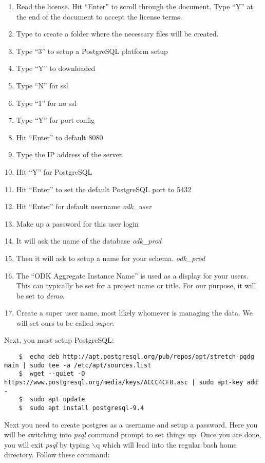 \begin{enumerate}
\item Read the license. Hit ``Enter'' to scroll through the document. Type ``Y'' at the end of the document to accept the license terms.
\item Type  to create a folder where the necessary files will be created.
\item  Type ``3'' to setup a PostgreSQL platform setup
\item Type ``Y'' to downloaded
\item Type ``N'' for ssl
\item Type ``1'' for no ssl
\item Type ``Y'' for port config
\item Hit ``Enter'' to default 8080
\item Type the IP address of the server.
\item Hit ``Y'' for PostgreSQL
\item Hit ``Enter'' to set the default PostgreSQL port to 5432
\item Hit ``Enter'' for default username \emph{odk\_user}
\item Make up a password for this user login
\item It will ask the name of the database \emph{odk\_prod}
\item Then it will ask to setup a name for your schema. \emph{odk\_prod}
\item The ``ODK Aggregate Instance Name'' is used as a display for your users. This can typically be set for a project name or title. For our purpose, it will be set to
\emph{demo}.
\item Create a super user name, most likely whomever is managing the data. We will set ours to be called \emph{super}.
\end{enumerate}

Next, you must setup PostgreSQL:
\begin{lstlisting}
	$  echo deb http://apt.postgresql.org/pub/repos/apt/stretch-pgdg main | sudo tee -a /etc/apt/sources.list
	$  wget --quiet -O https://www.postgresql.org/media/keys/ACCC4CF8.asc | sudo apt-key add -
	$  sudo apt update
	$  sudo apt install postgresql-9.4
\end{lstlisting}

Next you need to create postgres as a username and setup a password. Here you will be switching into \emph{psql} command prompt to set things up. Once you are done, you will exit \emph{psql} by typing $\backslash$q which will lead into the regular bash home directory. Follow these command:

